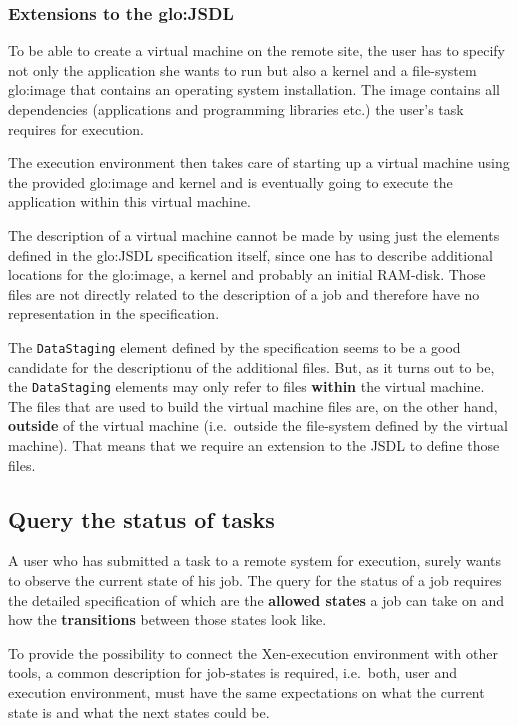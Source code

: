 \subsubsection{Extensions to the \gls{glo:JSDL}}

To be able to create a virtual machine on the remote site, the user has to
specify not only the application she wants  to run but also a kernel and a
file-system   \gls{glo:image}   that    contains   an   operating   system
installation.   The  image  contains  all dependencies  (applications  and
programming libraries etc.) the user's task requires for execution.

The execution environment then takes care of starting up a virtual machine
using the provided  \gls{glo:image} and kernel and is  eventually going to
execute the application within this virtual machine.

The description  of a  virtual machine  cannot be made  by using  just the
elements defined in the \gls{glo:JSDL} specification itself, since one has
to  describe additional locations  for the  \gls{glo:image}, a  kernel and
probably an initial RAM-disk.  Those files are not directly related to the
description  of  a  job  and  therefore  have  no  representation  in  the
specification.

The \texttt{DataStaging} element defined  by the specification seems to be
a good candidate for the descriptionu  of the additional files. But, as it
turns out to be, the \texttt{DataStaging} elements may only refer to files
\textbf{within} the virtual machine. The  files that are used to build the
virtual  machine files  are, on  the other  hand, \textbf{outside}  of the
virtual  machine  (i.e.~outside the  file-system  defined  by the  virtual
machine). That  means that we require  an extension to the  JSDL to define
those files.

\subsection{Query the status of tasks}
\label{sec:status-query}

A user who  has submitted a task to a remote  system for execution, surely
wants to observe the current state of his job. The query for the status of
a job requires the detailed specification of which are the \textbf{allowed
  states} a job can take on and how the \textbf{transitions} between those
states look like.

To provide  the possibility to connect the  Xen-execution environment with
other tools,  a common description for job-states  is required, i.e.~both,
user and  execution environment, must  have the same expectations  on what
the current  state is and  what the next  states could be.

